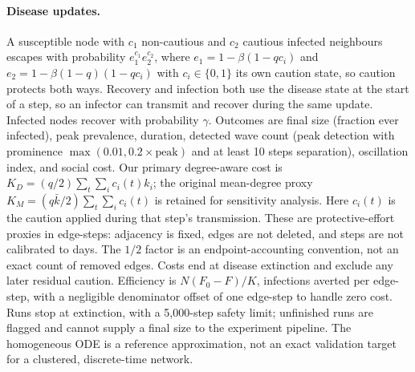 \documentclass[11pt,a4paper]{article}
\begin{document}
\paragraph{Disease updates.} A susceptible node with $c_1$ non-cautious and
$c_2$ cautious infected neighbours escapes with probability $e_1^{c_1}
e_2^{c_2}$, where $e_1 = 1-\beta(1-qc_i)$ and
$e_2 = 1-\beta(1-q)(1-qc_i)$ with $c_i \in \{0,1\}$ its own caution state, so
caution protects both ways. Recovery and infection both use the disease
state at the start of a step, so an infector can transmit and recover during
the same update. Infected nodes recover with probability $\gamma$.
Outcomes are final size (fraction ever infected), peak prevalence, duration,
detected wave count (peak detection with prominence $\max(0.01, 0.2 \times
\text{peak})$ and at least 10 steps separation), oscillation index, and social
cost. Our primary degree-aware cost is
$K_D=(q/2)\sum_t\sum_i c_i(t)k_i$; the original mean-degree proxy
$K_M=(q\bar{k}/2)\sum_t\sum_i c_i(t)$ is retained for sensitivity analysis.
Here $c_i(t)$ is the caution applied during that step's transmission.
These are protective-effort proxies in edge-steps: adjacency is fixed, edges
are not deleted, and steps are not calibrated to days. The $1/2$ factor is
an endpoint-accounting convention, not an exact count of removed edges.
Costs end at disease extinction and exclude any later residual caution.
Efficiency is $N(F_0-F)/K$, infections averted per edge-step, with a
negligible denominator offset of one edge-step to handle zero cost.
Runs stop at extinction, with a 5,000-step safety limit; unfinished runs are
flagged and cannot supply a final size to the experiment pipeline.
The homogeneous ODE is a reference approximation, not an exact validation
target for a clustered, discrete-time network.
\end{document}
